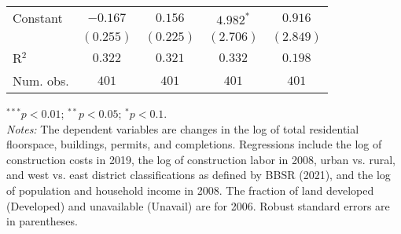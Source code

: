 \begin{table}
\begin{center}
\begin{footnotesize}
\begin{threeparttable}
\begin{tabular}{l c c c c}
Constant                    & $-0.167$       & $0.156$        & $4.982^{*}$    & $0.916$        \\
                            & $(0.255)$      & $(0.225)$      & $(2.706)$      & $(2.849)$      \\
\midrule
R$^2$                       & $0.322$        & $0.321$        & $0.332$        & $0.198$        \\
Num. obs.                   & $401$          & $401$          & $401$          & $401$          \\
\bottomrule
\end{tabular}
\begin{tablenotes}[flushleft]
\tiny{\item $^{***}p<0.01$; $^{**}p<0.05$; $^{*}p<0.1$. \\ \textit{Notes:} The dependent variables are changes in the log of total residential floorspace, buildings, permits, and completions. Regressions include the log of construction costs in 2019, the log of construction labor in 2008, urban vs. rural, and west vs. east district classifications as defined by BBSR (2021), and the log of population and household income in 2008. The fraction of land developed (Developed) and unavailable (Unavail) are for 2006. Robust standard errors are in parentheses.}
\end{tablenotes}
\end{threeparttable}
\end{footnotesize}
\label{tbl-ols-results-all-checked}
\end{center}
\end{table}

